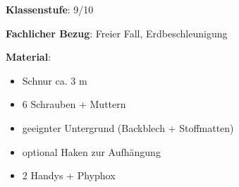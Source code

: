 \documentclass[../main.tex]{subfiles}
\begin{document}
\begin{tcolorbox}[
    width=\textwidth,
    height=\textheight,
    title=Phyphox: Fallschnur,
    fonttitle=\Large,
    before title=\vspace{0.2cm}, after title=\vspace{0.2cm},
    colback=white,
    title filled=true, 
    colbacktitle=myorange,
    colframe=black,
    coltitle=black,
    ]

    \begin{minipage}[]{0.75\textwidth}
        \vspace{0.2cm}
        \textbf{Klassenstufe}: 9/10

        \vspace{0.4cm}

        \textbf{Fachlicher Bezug}: Freier Fall, Erdbeschleunigung

        \vspace{0.4cm}

        \begin{minipage}[]{0.65\textwidth}
            \textbf{Material}: 
            \begin{itemize}[noitemsep]
                \item Schnur ca. $3$ m
                \item 6 Schrauben + Muttern
                \item geeignter Untergrund \newline (Backblech + Stoffmatten)
                \item optional Haken zur Aufhängung
                \item 2 Handys + Phyphox 
            \end{itemize}


\end{minipage}
\end{minipage}
\end{tcolorbox}
\end{document}
